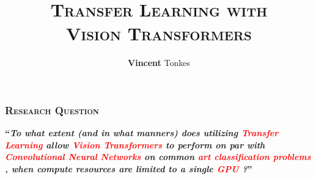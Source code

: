 \documentclass{beamer}
\title{\textsc{\bfseries Transfer Learning with\\Vision Transformers}}
\author{\textbf{Vincent} Tonkes}
\institute{\textbf{University} of Groningen}
\date{}
\newcommand{\createtitle}[1]{\frametitle{\textsc{\bfseries#1}}}
\begin{document}
{
}


\newcommand{\toexplain}[1]{
    \textcolor<2>{white}{\textcolor<3>{red}{#1}}
}
\begin{frame}
\createtitle{Research Question}
\begin{center}
\textbf{\large ``\textit{To what extent (and in what manners) does utilizing \toexplain{Transfer Learning} allow \toexplain{Vision Transformers} to perform on par with \toexplain{Convolutional Neural Networks} on common \toexplain{art classification problems}, when compute resources are limited to a single \toexplain{GPU}?}''}
\end{center}
\end{frame}



%

\end{document}
